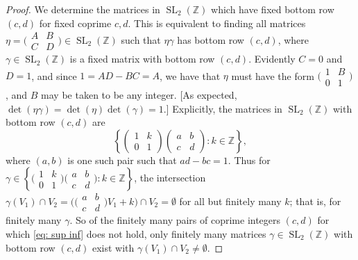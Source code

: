 \documentclass[10pt,leqno]{article}
\theoremstyle{plain}
\theoremstyle{definition}
\numberwithin{equation}{section}
\numberwithin{lem}{section}
\newcommand{\cbr}[1]{\left\{#1\right\}}
\DeclareMathOperator{\SL}{SL}
\begin{document}
\begin{proof}
    We determine the matrices in $\SL_2(\mathbb{Z})$ which have fixed bottom row $(c,d)$ for fixed coprime $c,d$. This is equivalent to finding all matrices $\eta = \big(\!\begin{smallmatrix}
        A & B \\ C & D
    \end{smallmatrix}\!\big)\in \SL_2(\mathbb{Z})$ such that $\eta\gamma$ has bottom row $(c,d)$, where $\gamma\in \SL_2(\mathbb{Z})$ is a fixed matrix with  bottom row $(c,d)$. Evidently $C=0$ and $D = 1$, and since $1 = AD - BC = A$, we have that $\eta$ must have the form $\big(\!\begin{smallmatrix}
        1 & B \\ 0  & 1
    \end{smallmatrix}\!\big)$, and $B$ may be taken to be any integer. [As expected, $\det(\eta\gamma) = \det(\eta)\det(\gamma) = 1$.] Explicitly, the matrices in $\SL_2(\mathbb{Z})$ with bottom row $(c,d)$ are \[\cbr{\begin{pmatrix}
        1 & k \\ 0 & 1
    \end{pmatrix}\begin{pmatrix}
        a & b \\ c & d
    \end{pmatrix}: k\in \mathbb{Z}},\]
    where $(a,b)$ is one such pair such that $ad-bc = 1$. Thus for $\gamma\in \cbr{\big(\!\begin{smallmatrix}
        1 & k \\ 0 & 1
    \end{smallmatrix}\!\big)\big(\!\begin{smallmatrix}
        a & b \\ c & d
    \end{smallmatrix}\!\big): k\in \mathbb{Z}}$, the intersection $\gamma(V_1)\cap V_2 = \big(\big(\!\begin{smallmatrix}
        a & b \\ c & d
    \end{smallmatrix}\!\big)V_1+ k\big)\cap V_2 =\emptyset$ for all but finitely many $k$; that is, for finitely many $\gamma$. So of the finitely many pairs of coprime integers $(c,d)$ for which \cref{eq: sup inf} does not hold, only finitely many matrices $\gamma\in \SL_2(\mathbb{Z})$ with bottom row $(c,d)$ exist with $\gamma(V_1)\cap V_2\neq \emptyset$.


\end{proof}
\end{document}
